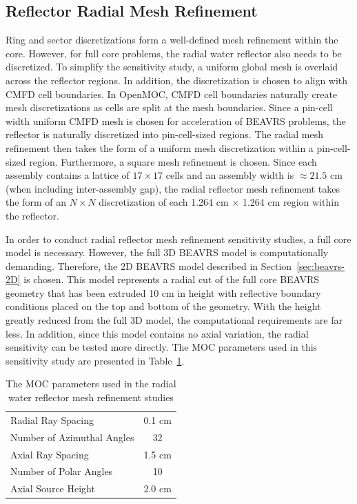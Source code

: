 \clearpage
\subsection{Reflector Radial Mesh Refinement}

Ring and sector discretizations form a well-defined mesh refinement within the core. However, for full core problems, the radial water reflector also needs to be discretized. To simplify the sensitivity study, a uniform global mesh is overlaid across the reflector regions. In addition, the discretization is chosen to align with \ac{CMFD} cell boundaries. In OpenMOC, \ac{CMFD} cell boundaries naturally create mesh discretizations as cells are split at the mesh boundaries. Since a pin-cell width uniform \ac{CMFD} mesh is chosen for acceleration of BEAVRS problems, the reflector is naturally discretized into pin-cell-sized regions. The radial mesh refinement then takes the form of a uniform mesh discretization within a pin-cell-sized region. Furthermore, a square mesh refinement is chosen. Since each assembly contains a lattice of $17\times 17$ cells and an assembly width is $\approx 21.5$ cm (when including inter-assembly gap), the radial reflector mesh refinement takes the form of an $N \times N$ discretization of each 1.264 cm $\times$ 1.264 cm region within the reflector.

In order to conduct radial reflector mesh refinement sensitivity studies, a full core model is necessary. However, the full 3D BEAVRS model is computationally demanding. Therefore, the 2D BEAVRS model described in Section~\ref{sec:beavrs-2D} is chosen. This model represents a radial cut of the full core BEAVRS geometry that has been extruded 10 cm in height with reflective boundary conditions placed on the top and bottom of the geometry. With the height greatly reduced from the full 3D model, the computational requirements are far less. In addition, since this model contains no axial variation, the radial sensitivity can be tested more directly. The \ac{MOC} parameters used in this sensitivity study are presented in Table~\ref{tab:rad-ref-refinement-params}.


\begin{table}[ht]
	\centering
	\caption{The MOC parameters used in the radial water reflector mesh refinement studies}
	\medskip
	\begin{tabular}{lc}
		\hline
		Radial Ray Spacing & 0.1 cm \\
		Number of Azimuthal Angles & 32 \\
		Axial Ray Spacing & 1.5 cm \\
		Number of Polar Angles & 10 \\
		Axial Source Height & 2.0 cm \\
		\hline
	\end{tabular}
	\label{tab:rad-ref-refinement-params}
\end{table}

